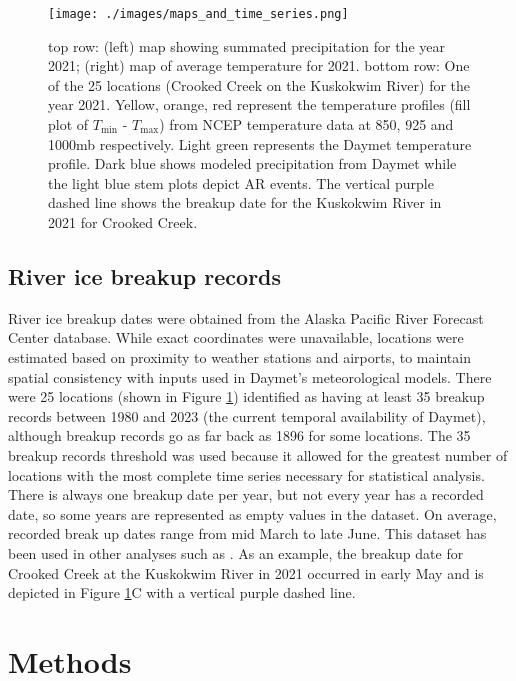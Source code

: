 \documentclass[12pts,draft]{AR_analysis_}
\begin{document}
\begin{figure}
\centering
\texttt{[image: ./images/maps\_and\_time\_series.png]}
	\caption{top row: (left) map showing summated precipitation for the
	year 2021; (right) map of average temperature for 2021. bottom row:
	One of the 25 locations (Crooked Creek on the Kuskokwim
	River) for the year 2021. Yellow, orange, red represent the
	temperature profiles (fill plot of $T_{\text{min}}$ -
	$T_{\text{max}}$) from NCEP
	temperature data at 850, 925 and 1000mb respectively. Light
	green represents the Daymet temperature profile. Dark blue shows
	modeled precipitation from Daymet while the light blue stem
	plots depict AR events. The vertical purple dashed line shows the breakup
	date for the Kuskokwim River in 2021 for Crooked Creek.}
\label{fig:concatenated_maps_precip_temp_plot} 
\end{figure}

\subsection{River ice breakup records}

River ice breakup dates 
were obtained from the Alaska Pacific River Forecast Center database.
While exact coordinates were unavailable, locations 
were estimated based on proximity to weather stations and airports, to 
maintain spatial consistency with inputs used in Daymet’s meteorological 
models. There were 25 locations (shown in Figure 
\ref{fig:concatenated_maps_precip_temp_plot}) identified as 
having at least 35 breakup 
records between 1980 and 2023 (the current temporal availability of 
Daymet), although breakup records go as far back as 1896 for some 
locations. The 35 breakup records threshold was used because it 
allowed for the greatest 
number of locations with the most complete time series 
necessary for statistical analysis. There is always one breakup 
date per year, but not every year has a recorded date, so some 
years are represented as empty values in the dataset. On average, 
recorded break up dates range from mid March to late 
June. This dataset has been used in other analyses such as 
\cite{murphy2022, Brown2018, Bieniek2011}. As an example, 
the breakup date for Crooked Creek 
at the Kuskokwim River in 2021 occurred in early May and
is depicted in Figure 
\ref{fig:concatenated_maps_precip_temp_plot}C with a 
vertical purple dashed line.



\section{Methods}
\end{document}

